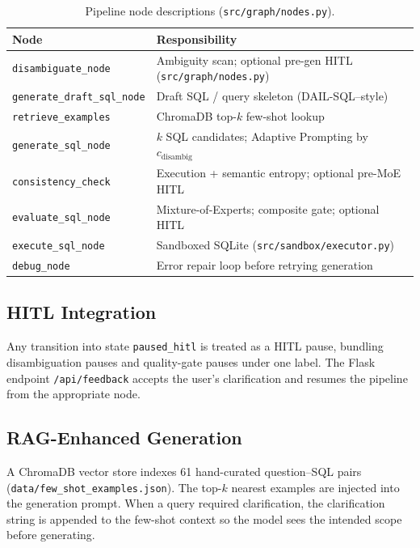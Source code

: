 \documentclass{article}
\begin{document}
\begin{table}[h]
\centering
\caption{Pipeline node descriptions (\texttt{src/graph/nodes.py}).}
\label{tab:nodes}
\small
\begin{tabular}{lp{9.0cm}}
\toprule
\textbf{Node} & \textbf{Responsibility} \\
\midrule
\texttt{disambiguate\_node}   & Ambiguity scan; optional pre-gen HITL (\texttt{src/graph/nodes.py}) \\
\texttt{generate\_draft\_sql\_node} & Draft SQL / query skeleton (DAIL-SQL--style) \\
\texttt{retrieve\_examples}   & ChromaDB top-$k$ few-shot lookup \\
\texttt{generate\_sql\_node}  & $k$ SQL candidates; Adaptive Prompting by $c_{\text{disambig}}$ \\
\texttt{consistency\_check}   & Execution + semantic entropy; optional pre-MoE HITL \\
\texttt{evaluate\_sql\_node}  & Mixture-of-Experts; composite gate; optional HITL \\
\texttt{execute\_sql\_node}   & Sandboxed SQLite (\texttt{src/sandbox/executor.py}) \\
\texttt{debug\_node}         & Error repair loop before retrying generation \\
\bottomrule
\end{tabular}
\end{table}

\subsection{HITL Integration}

Any transition into state \texttt{paused\_hitl} is treated as a HITL pause,
bundling disambiguation pauses and quality-gate pauses under one label.
The Flask endpoint \texttt{/api/feedback} accepts the user's clarification
and resumes the pipeline from the appropriate node.

\subsection{RAG-Enhanced Generation}

A ChromaDB vector store indexes 61 hand-curated question--SQL pairs
(\texttt{data/few\_shot\_examples.json}).
The top-$k$ nearest examples are injected into the generation prompt.
When a query required clarification, the clarification string is appended
to the few-shot context so the model sees the intended scope before generating.
\end{document}
